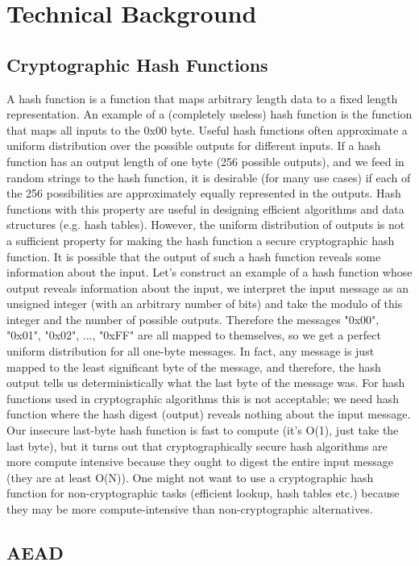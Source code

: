 \chapter{Technical Background}
\section{Cryptographic Hash Functions}
A hash function is a function that maps arbitrary length data to a fixed length representation. An example of a (completely useless) hash function is the function that maps all inputs to the 0x00 byte. Useful hash functions often approximate a uniform distribution over the possible outputs for different inputs. If a hash function has an output length of one byte (256 possible outputs), and we feed in random strings to the hash function, it is desirable (for many use cases) if each of the 256 possibilities are approximately equally represented in the outputs. Hash functions with this property are useful in designing efficient algorithms and data structures (e.g. hash tables). However, the uniform distribution of outputs is not a sufficient property for making the hash function a secure cryptographic hash function. It is possible that the output of such a hash function reveals some information about the input. Let's construct an example of a hash function whose output reveals information about the input, we interpret the input message as an unsigned integer (with an arbitrary number of bits) and take the modulo of this integer and the number of possible outputs. Therefore the messages "0x00", "0x01", "0x02", ..., "0xFF" are all mapped to themselves, so we get a perfect uniform distribution for all one-byte messages. In fact, any message is just mapped to the least significant byte of the message, and therefore, the hash output tells us deterministically what the last byte of the message was. For hash functions used in cryptographic algorithms this is not acceptable; we need hash function where the hash digest (output) reveals nothing about the input message. Our insecure last-byte hash function is fast to compute (it's O(1), just take the last byte), but it turns out that cryptographically secure hash algorithms are more compute intensive because they ought to digest the entire input message (they are at least O(N)). One might not want to use a cryptographic hash function for non-cryptographic tasks (efficient lookup, hash tables etc.) because they may be more compute-intensive than non-cryptographic alternatives.
\section{AEAD}

